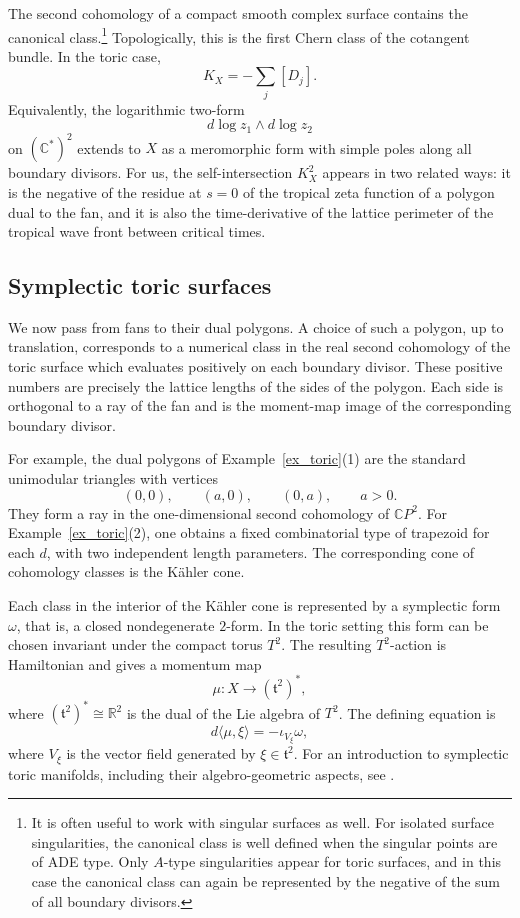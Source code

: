 \documentclass[a4paper,american,11pt]{amsart}
\theoremstyle{plain}
\theoremstyle{definition}
\newcommand{\R}{\mathbb R}
\newcommand{\C}{\mathbb C}
\begin{document}
The second cohomology of a compact smooth complex surface contains the
canonical class.\footnote{It is often useful to work with singular surfaces as
well.  For isolated surface singularities, the canonical class is well defined
when the singular points are of ADE type.  Only \(A\)-type singularities
appear for toric surfaces, and in this case the canonical class can again be
represented by the negative of the sum of all boundary divisors.}
Topologically, this is the first Chern class of the cotangent bundle.  In the
toric case,
\[
K_X=-\sum_j [D_j].
\]
Equivalently, the logarithmic two-form
\[
d\log z_1\wedge d\log z_2
\]
on \((\C^*)^2\) extends to \(X\) as a meromorphic form with simple poles
along all boundary divisors.  For us, the self-intersection \(K_X^2\) appears
in two related ways: it is the negative of the residue at \(s=0\) of the
tropical zeta function of a polygon dual to the fan, and it is also the
time-derivative of the lattice perimeter of the tropical wave front between
critical times.

\subsection{Symplectic toric surfaces}\label{ssec:sympltor}

We now pass from fans to their dual polygons.  A choice of such a polygon,
up to translation, corresponds to a numerical class in the real second
cohomology of the toric surface which evaluates positively on each boundary
divisor.  These positive numbers are precisely the lattice lengths of the sides
of the polygon.  Each side is orthogonal to a ray of the fan and is the
moment-map image of the corresponding boundary divisor.

For example, the dual polygons of Example~\ref{ex_toric}(1) are the standard
unimodular triangles with vertices
\[
(0,0),\qquad (a,0),\qquad (0,a),
\qquad a>0.
\]
They form a ray in the one-dimensional second cohomology of \(\C P^2\).
For Example~\ref{ex_toric}(2), one obtains a fixed combinatorial type of
trapezoid for each \(d\), with two independent length parameters.  The
corresponding cone of cohomology classes is the K\"ahler cone.

Each class in the interior of the K\"ahler cone is represented by a symplectic
form \(\omega\), that is, a closed nondegenerate \(2\)-form.  In the toric
setting this form can be chosen invariant under the compact torus \(T^2\).
The resulting \(T^2\)-action is Hamiltonian and gives a momentum map
\[
\mu:X\longrightarrow(\mathfrak t^2)^*,
\]
where \((\mathfrak t^2)^*\cong\R^2\) is the dual of the Lie algebra of
\(T^2\).  The defining equation is
\[
d\langle\mu,\xi\rangle=-\iota_{V_\xi}\omega,
\]
where \(V_\xi\) is the vector field generated by
\(\xi\in\mathfrak t^2\).  For an introduction to symplectic toric manifolds,
including their algebro-geometric aspects, see \cite{da2003symplectic}.
\end{document}
